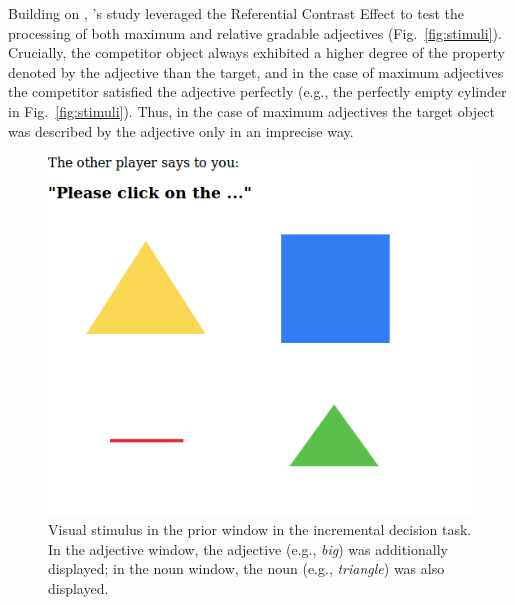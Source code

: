 \documentclass[10pt,letterpaper]{article}
\begin{document}
Building on , 's study leveraged the Referential Contrast Effect to test the processing of both maximum
 and relative gradable adjectives (Fig.~\ref{fig:stimuli}).
Crucially, the competitor object always exhibited a higher degree of the property denoted by the adjective 
 than the target, and in the case of maximum adjectives the competitor satisfied the adjective perfectly
 (e.g., the perfectly empty cylinder in Fig.~\ref{fig:stimuli}). 
Thus, in the case of maximum adjectives the target object was described by the adjective only in 
 an imprecise way.




\begin{figure}[ht]
  \centering
    \includegraphics[width=.35\textwidth]{plots/MTurkExpPrior.png}
    \vspace{-4ex}
  \caption{Visual stimulus in the prior window in the incremental decision task. In the adjective window, the adjective (e.g., \emph{big}) was additionally displayed; in the noun window, the noun (e.g., \emph{triangle}) was also displayed.}
      \vspace{-2ex}
  \label{fig:mturk}
\end{figure}
\end{document}
